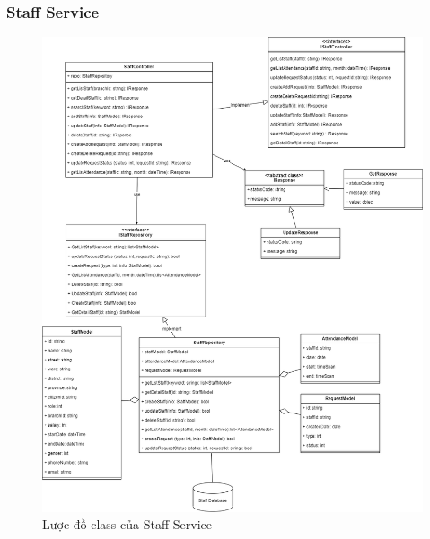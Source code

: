 \subsubsection{Staff Service}
\begin{figure}[!htp]
	\centering
	\includegraphics[width=13cm]{img/Architecture/service/StaffService.png}
	\newline
	\caption{Lược đồ class của Staff Service}
\end{figure}

